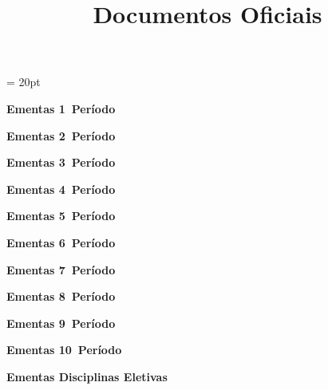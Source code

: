 \documentclass[12pt,a4paper]{article}
\title{Documentos Oficiais}
\begin{document}
\pagestyle{firstpage} %
\headsep = 20pt
\setlength{\parindent}{0cm} %
\vspace*{10.0cm}
\begin{center}
    \textbf{\LARGE Ementas 1\textordmasculine~Período}
\end{center}
\pagebreak
\vspace*{10.0cm}
\begin{center}
    \textbf{\LARGE Ementas 2\textordmasculine~Período}
\end{center}
\pagebreak
\vspace*{10.0cm}
\begin{center}
    \textbf{\LARGE Ementas 3\textordmasculine~Período}
\end{center}
\pagebreak
\vspace*{10.0cm}
\begin{center}
    \textbf{\LARGE Ementas 4\textordmasculine~Período}
\end{center}
\pagebreak
\vspace*{10.0cm}
\begin{center}
    \textbf{\LARGE Ementas 5\textordmasculine~Período}
\end{center}
\pagebreak
\vspace*{10.0cm}
\begin{center}
    \textbf{\LARGE Ementas 6\textordmasculine~Período}
\end{center}
\pagebreak
\vspace*{10.0cm}
\begin{center}
    \textbf{\LARGE Ementas 7\textordmasculine~Período}
\end{center}
\pagebreak
\vspace*{10.0cm}
\begin{center}
    \textbf{\LARGE Ementas 8\textordmasculine~Período}
\end{center}
\pagebreak
\vspace*{10.0cm}
\begin{center}
    \textbf{\LARGE Ementas 9\textordmasculine~Período}
\end{center}
\pagebreak
\vspace*{10.0cm}
\begin{center}
    \textbf{\LARGE Ementas 10\textordmasculine~Período}
\end{center}
\pagebreak
\vspace*{10.0cm}
\begin{center}
    \textbf{\LARGE Ementas Disciplinas Eletivas}
\end{center}
\end{document}
